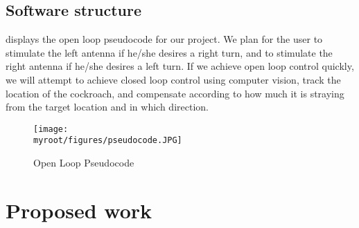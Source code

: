 \documentclass[twocolumn,10pt]{IEEEtran}
\newcommand{\myroot}{.}
\begin{document}
\subsection{Software structure}
 displays the open loop pseudocode for our project. We plan for the user to stimulate the left antenna if he/she desires a right turn, and to stimulate the right antenna if he/she desires a left turn. If we achieve open loop control quickly, we will attempt to achieve closed loop control using computer vision, track the location of the cockroach, and compensate according to how much it is straying from the target location and in which direction.
\begin{figure}[ht!]
\centering
\texttt{[image: \\myroot/figures/pseudocode.JPG]}
\caption{Open Loop Pseudocode}
\label{fig:pseudocode}
\end{figure}




\section{Proposed work}
\end{document}
